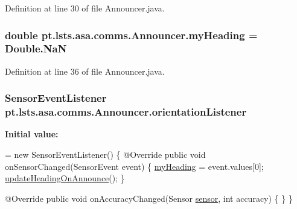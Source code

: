 Definition at line 30 of file Announcer.\+java.

\hypertarget{classpt_1_1lsts_1_1asa_1_1comms_1_1Announcer_a12bf9859e53e247eea25e7d1428ce942}{}
\subsubsection[{my\+Heading}]{\setlength{\rightskip}{0pt plus 5cm}double pt.\+lsts.\+asa.\+comms.\+Announcer.\+my\+Heading = Double.\+Na\+N\hspace{0.3cm}{\ttfamily [private]}}\label{classpt_1_1lsts_1_1asa_1_1comms_1_1Announcer_a12bf9859e53e247eea25e7d1428ce942}


Definition at line 36 of file Announcer.\+java.

\hypertarget{classpt_1_1lsts_1_1asa_1_1comms_1_1Announcer_a785165a29d4299dd7e5cddf9a656eccd}{}
\subsubsection[{orientation\+Listener}]{\setlength{\rightskip}{0pt plus 5cm}Sensor\+Event\+Listener pt.\+lsts.\+asa.\+comms.\+Announcer.\+orientation\+Listener\hspace{0.3cm}{\ttfamily [private]}}\label{classpt_1_1lsts_1_1asa_1_1comms_1_1Announcer_a785165a29d4299dd7e5cddf9a656eccd}
{\bfseries Initial value\+:}
\begin{DoxyCode}
= \textcolor{keyword}{new} SensorEventListener() \{
        @Override
        \textcolor{keyword}{public} \textcolor{keywordtype}{void} onSensorChanged(SensorEvent event) \{
            \hyperlink{classpt_1_1lsts_1_1asa_1_1comms_1_1Announcer_a12bf9859e53e247eea25e7d1428ce942}{myHeading} = \textcolor{keyword}{event}.values[0];
            \hyperlink{classpt_1_1lsts_1_1asa_1_1comms_1_1Announcer_a34cc1070a50e7a229ea0349111dce02b}{updateHeadingOnAnnounce}();
        \}

        @Override
        \textcolor{keyword}{public} \textcolor{keywordtype}{void} onAccuracyChanged(Sensor \hyperlink{classpt_1_1lsts_1_1asa_1_1comms_1_1Announcer_afab33815ef31c419af79ffc274c59030}{sensor}, \textcolor{keywordtype}{int} accuracy) \{
        \}
    \}
\end{DoxyCode}


